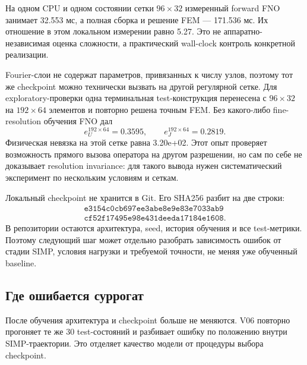 На одном CPU и одном состоянии сетки $96\times32$ измеренный forward FNO занимает 32.553 мс, а полная сборка и решение FEM --- 171.536 мс. Их отношение в этом локальном измерении равно 5.27. Это не аппаратно-независимая оценка сложности, а практический wall-clock контроль конкретной реализации.

Fourier-слои не содержат параметров, привязанных к числу узлов, поэтому тот же checkpoint можно технически вызвать на другой регулярной сетке. Для exploratory-проверки одна терминальная test-конструкция перенесена с $96\times32$ на $192\times64$ элементов и повторно решена точным FEM. Без какого-либо fine-resolution обучения FNO дал
\begin{equation}
\label{eq:practical-v05-resolution-transfer}
 e_U^{192\times64}
 =
 0.3595,
 \qquad
 e_J^{192\times64}
 =
 0.2819.
\end{equation}
Физическая невязка на этой сетке равна 3.20e+02. Этот опыт проверяет возможность прямого вызова оператора на другом разрешении, но сам по себе не доказывает resolution invariance: для такого вывода нужен систематический эксперимент по нескольким условиям и сеткам.

Локальный checkpoint не хранится в Git. Его SHA256 разбит на две строки:
\begin{equation}
\label{eq:practical-v05-checkpoint-hash}
 \begin{gathered}
  \texttt{e3154c0cb697ee3abe8e9e83e7033ab9}\\
  \texttt{cf52f17495e98e431deeda17184e1608}.
 \end{gathered}
\end{equation}
В репозитории остаются архитектура, seed, история обучения и все test-метрики. Поэтому следующий шаг может отдельно разобрать зависимость ошибок от стадии SIMP, условия нагрузки и требуемой точности, не меняя уже обученный baseline.

\subsection{Где ошибается суррогат}
\label{subsec:practical-v06-error-structure}

После обучения архитектура и checkpoint больше не меняются. V06 повторно прогоняет те же $30$ test-состояний и разбивает ошибку по положению внутри SIMP-траектории. Это отделяет качество модели от процедуры выбора checkpoint.

